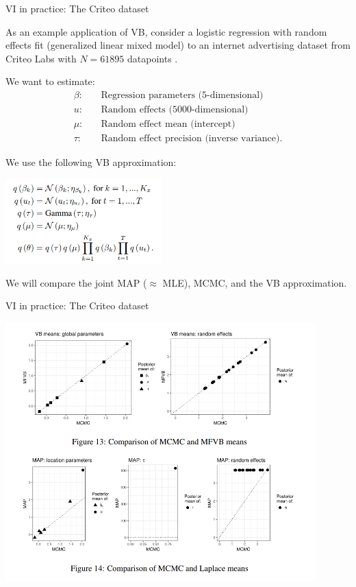 \begin{frame}{VI in practice: The Criteo dataset}

As an example application of VB, consider a logistic regression with random
effects fit (generalized linear mixed model) to an internet advertising dataset
from Criteo Labs with $N=61895$ datapoints \citep[Section
5.3]{giordano2018covariances}.

We want to estimate:
%
\begin{align*}
%
\beta:{}&\quad\textrm{Regression parameters (5-dimensional)} \\
u:{}&\quad\textrm{Random effects (5000-dimensional)} \\
\mu:{}&\quad\textrm{Random effect mean (intercept)} \\
\tau:{}&\quad\textrm{Random effect precision (inverse variance)}.
%
\end{align*}
%
\pause

We use the following VB approximation:

\begin{center}
\includegraphics[width=0.45\textwidth]{static_images/Criteo_vb.png}
\end{center}

We will compare the joint MAP ($\approx$ MLE), MCMC, and the VB approximation.

\end{frame}



\begin{frame}{VI in practice: The Criteo dataset}

\begin{center}
\includegraphics[width=0.9\textwidth]{static_images/Criteo_means.png}
\end{center}

\end{frame}



